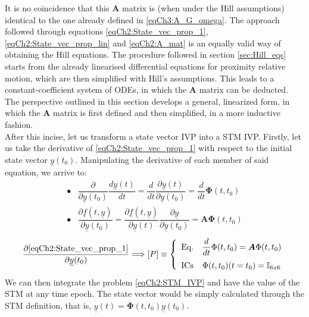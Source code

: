 	\indent It is no coincidence that this $\bm A$ matrix is (when under the Hill assumptions) identical to the one already defined in \eqref{eqCh3:A_G_omega}. The approach followed through equations \eqref{eqCh2:State_vec_prop_1}, \eqref{eqCh2:State_vec_prop_lin} and \eqref{eqCh2:A_mat} is an equally valid way of obtaining the Hill equations. The procedure followed in section \ref{sec:Hill_eqs} starts from the already linearised differential equations for proximity relative motion, which are then simplified with Hill's assumptions. This leads to a constant-coefficient system of ODEs, in which the $\bm A$ matrix can be deducted. The perspective outlined in this section develops a general, linearized form, in which the $\bm A$ matrix is first defined and then simplified, in a more inductive fashion.\\
	\indent After this incise, let us transform a state vector IVP into a STM IVP. Firstly, let us take the derivative of \eqref{eqCh2:State_vec_prop_1} with respect to the initial state vector $\underline{y}(t_0)$. Manipulating the derivative of each member of said equation, we arrive to:
	\[
	\begin{array}{ll}
	\bullet & \dfrac{\partial}{{\partial \underline{y}(t_0)}} \dfrac{d\underline{y}(t)}{dt} = \dfrac{d}{dt}\dfrac{\partial \underline{y}(t)} {{\partial \underline{y}(t_0)}} = \dfrac{d}{dt} \bm \Phi (t, t_0) \\
	\bullet & \dfrac{\partial \underline{f}(t, \underline{y})}{{\partial \underline{y}(t_0)}}  = \dfrac{\partial \underline{f}(t, \underline{y})}{{\partial \underline{y}(t)}} \dfrac{\partial \underline{y}}{{\partial \underline{y}(t_0)}} = \bm A \bm \Phi(t, t_0)
	\end{array}
	\]
	\begin{equation}
	\dfrac{\partial \eqref{eqCh2:State_vec_prop_1}}{\partial \underline{y}(t_0)} \Longrightarrow [P]\equiv\left\{ \begin{array}{lcc}
	\text{Eq.} &  \dfrac{d}{dt} \Phi (t, t_0) = \mbox{\boldmath{${A}$}} \Phi (t, t_0)\\[1em]
	\text{ICs} &  \Phi (t, t_0) (t = t_0) = \mathbb{I}_{6x6} 
	\end{array}\right.
	\label{eqCh2:STM_IVP}
	\end{equation}
	\indent We can then integrate the problem \eqref{eqCh2:STM_IVP} and have the value of the STM at any time epoch. The state vector would be simply calculated through the STM definition, that is, $\underline{y}(t) = \bm \Phi (t, t_0) \underline{y}(t_0)$.
